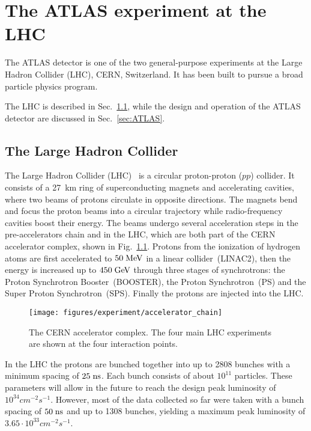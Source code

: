 \chapter{The ATLAS experiment at the LHC}
\label{sec:experiment}

The ATLAS detector is one of the two general-purpose experiments 
at the Large Hadron Collider (LHC), CERN, Switzerland.
It has been built to pursue a broad particle physics program. 

The LHC is described in Sec.~\ref{sec:LHC}, while the design and operation of the 
ATLAS detector are discussed in Sec.~\ref{sec:ATLAS}.

\section{The Large Hadron Collider}
\label{sec:LHC}

The Large Hadron Collider (LHC)~\cite{LHCreport12, *LHCreport3} 
is a circular proton-proton ($pp$) collider.
It consists of a 27~km ring of superconducting magnets and
accelerating cavities, where two beams of protons circulate in
opposite directions.
The magnets bend and focus the proton beams into a circular trajectory while radio-frequency
cavities boost their energy.
The beams undergo several acceleration steps in the pre-accelerators chain
and in the LHC, which are both part of the CERN accelerator complex, shown in Fig.~\ref{fig:lhc}.
Protons from the ionization of hydrogen atoms are first accelerated to \mbox{$50 \; \mathrm{MeV}$}
in a linear collider~(LINAC2), then the energy is increased up to
\mbox{$450 \; \mathrm{GeV}$} through three stages of synchrotrons: the Proton
Synchrotron Booster~(BOOSTER), the Proton Synchrotron~(PS) and the Super Proton Synchrotron~(SPS).
Finally the protons are injected into the LHC.

\begin{figure}[ht]
\begin{center}
\texttt{[image: figures/experiment/accelerator\_chain]}
\caption[CERN Accelerator complex]{
  The CERN accelerator complex. The four main LHC experiments are
  shown at the four interaction points.}
\label{fig:lhc}
\end{center}
\end{figure}

In the LHC the protons are bunched together into up to 2808 bunches 
with a minimum spacing of \mbox{$25 \; \mathrm{ns}$}. 
Each bunch consists of about $10^{11}$ particles. 
These parameters will allow in the future to reach 
the design peak luminosity of \mbox{$10^{34} cm^{-2}s^{-1}$}.
However, most of the data collected so far were taken with a bunch 
spacing of \mbox{$50 \; \mathrm{ns}$} and up to 1308 bunches, 
yielding a maximum peak luminosity of \mbox{$3.65\cdot{}10^{33} cm^{-2}s^{-1}$}.

